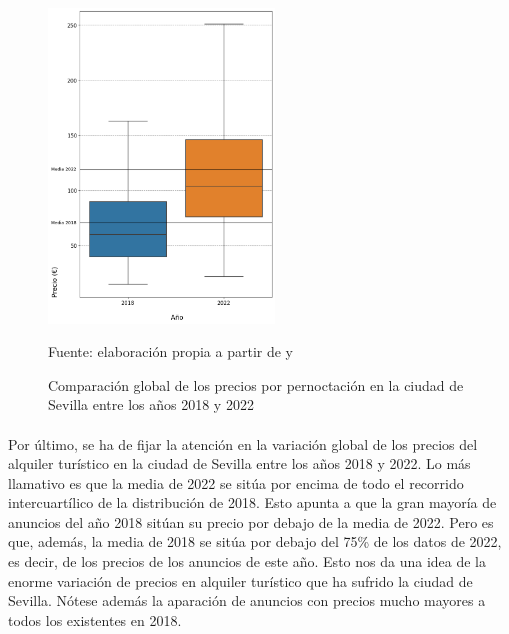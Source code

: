 \documentclass[a4paper,10pt]{article}
\begin{document}
            \begin{figure}
                \begin{flushleft}
                    \includegraphics*[width = 6cm]{graphics/seville_global_comparison_price.png}
                    \begin{flushleft}
                        \footnotesize{Fuente: elaboración propia a partir de \cite[(2)]{datahippo} y \cite[(1)]{insideairbnb}}
                    \end{flushleft}
                    \caption{Comparación global de los precios por pernoctación en la ciudad de Sevilla entre los años 2018 y 2022}
                \end{flushleft}
            \end{figure}

            \paragraph*{}
            Por último, se ha de fijar la atención en la variación global de los precios del alquiler turístico en la ciudad de Sevilla 
            entre los años 2018 y 2022. Lo más llamativo es que la media de 2022 se sitúa por encima de todo el recorrido intercuartílico de 
            la distribución de 2018. Esto apunta a que la gran mayoría de anuncios del año 2018 sitúan su precio por debajo de la media de 2022. 
            Pero es que, además, la media de 2018 se sitúa por debajo del 75\% de los datos de 2022, es decir, de los precios de los anuncios de este año.
            Esto nos da una idea de la enorme variación de precios en alquiler turístico que ha sufrido la ciudad de Sevilla. Nótese además
            la aparación de anuncios con precios mucho mayores a todos los existentes en 2018.
\end{document}
